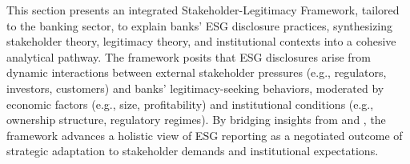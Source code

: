 \documentclass[
  authoryear]{elsarticle}
\begin{document}
This section presents an integrated Stakeholder-Legitimacy Framework,
tailored to the banking sector, to explain banks' ESG disclosure
practices, synthesizing stakeholder theory, legitimacy theory, and
institutional contexts into a cohesive analytical pathway. The framework
posits that ESG disclosures arise from dynamic interactions between
external stakeholder pressures (e.g., regulators, investors, customers)
and banks' legitimacy-seeking behaviors, moderated by economic factors
(e.g., size, profitability) and institutional conditions (e.g.,
ownership structure, regulatory regimes). By bridging insights from
\citet{CAMPBELL2007} and \citet{AGUINIS2012}, the framework advances a
holistic view of ESG reporting as a negotiated outcome of strategic
adaptation to stakeholder demands and institutional expectations.


  
\end{document}
